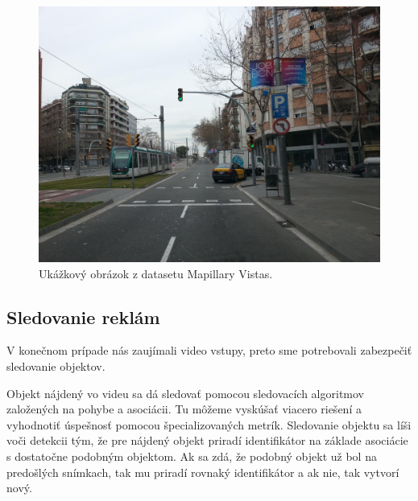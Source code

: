 
\begin{figure}[ht]
    \centering
    \includegraphics[width=1\textwidth]{images/02/mapillar.jpg}
    \caption{Ukážkový obrázok z datasetu Mapillary Vistas.}
    \label{img:dataset}
\end{figure}

\subsection{Sledovanie reklám}

V konečnom prípade nás zaujímali video vstupy, preto sme potrebovali zabezpečiť sledovanie objektov.

Objekt nájdený vo videu sa dá sledovať pomocou sledovacích algoritmov založených na pohybe a asociácii. Tu môžeme vyskúšať viacero riešení a vyhodnotiť úspešnosť pomocou špecializovaných metrík. Sledovanie objektu sa líši voči detekcii tým, že pre nájdený objekt priradí identifikátor na základe asociácie s dostatočne podobným objektom. Ak sa zdá, že podobný objekt už bol na predošlých snímkach, tak mu priradí rovnaký identifikátor a ak nie, tak vytvorí nový. 


